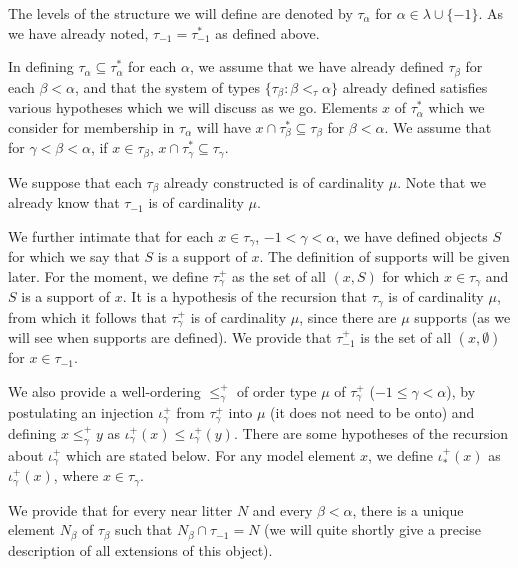 \documentclass[112pt]{article}
\begin{document}
The levels of the structure we will define are denoted by $\tau_\alpha$ for \newline $\alpha \in \lambda \cup \{-1\}$.  As we have already noted, $\tau_{-1}=\tau^*_{-1}$ as defined above.

In defining $\tau_\alpha \subseteq \tau^*_\alpha$ for each $\alpha$, we assume that we have already defined $\tau_\beta$ for each $\beta<\alpha$, and that the system of types $\{\tau_\beta:\beta <_\tau \alpha\}$ already defined satisfies various hypotheses which we will discuss as we go.
Elements $x$ of $\tau^*_\alpha$ which we consider for membership in $\tau_\alpha$ will have $x \cap \tau^*_\beta \subseteq \tau_\beta$ for $\beta<\alpha$.  We assume that for $\gamma<\beta<\alpha$, if $x \in \tau_\beta$, $x \cap \tau^*_\gamma \subseteq \tau_\gamma$.

We suppose that each $\tau_\beta$ already constructed is of cardinality $\mu$.  Note that we already know that
$\tau_{-1}$ is of cardinality $\mu$.


We further intimate that for each $x \in \tau_\gamma$, $-1<\gamma<\alpha$, we have defined objects $S$ for which we say that $S$ is a support of $x$.  The definition of supports will be given later.  For the moment, we define $\tau_\gamma^+$ as the set of all $(x,S)$ for which $x \in \tau_\gamma$ and $S$ is a support of $x$.  It is a hypothesis of the recursion
that $\tau_\gamma$ is of cardinality $\mu$, from which it follows that  $\tau^+_\gamma$ is of cardinality $\mu$, since there are $\mu$ supports (as we will see when supports are defined). We provide that $\tau_{-1}^+$ is the set
of all $(x,\emptyset)$ for $x \in \tau_{-1}$.  

We also provide a well-ordering $\leq^+_\gamma$ of order type $\mu$ of $\tau_\gamma^+$ ($-1 \leq \gamma <\alpha$), by postulating an injection $\iota^+_\gamma$ from $\tau_\gamma^+$ into $\mu$ (it does not need to be onto) and defining $x \leq^+_\gamma y$ as $\iota^+_\gamma(x) \leq \iota^+_\gamma(y)$.   There are some hypotheses of the recursion about $\iota^+_\gamma$ which are stated below.   For any model element $x$, we define $\iota^+_*(x)$ as $\iota^+_\gamma(x)$, where $x \in \tau_\gamma$.


We provide that for every near litter $N$ and every $\beta<\alpha$, there is a unique element $N_\beta$ of $\tau_\beta$ such that $N_\beta \cap \tau_{-1}=N$ (we will quite shortly give a precise description of all extensions of this object).
\end{document}
